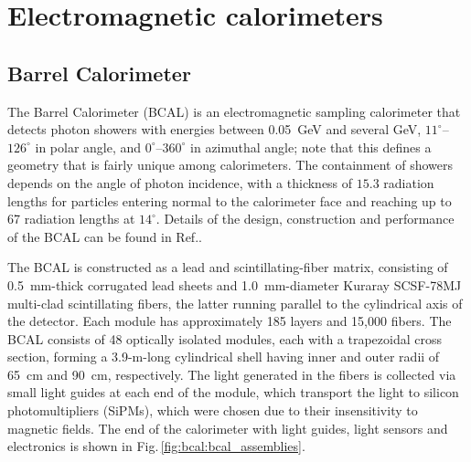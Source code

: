 \section[Electromagnetic calorimeters] {Electromagnetic calorimeters \label{sec:calorimeters}}

\subsection[Barrel Calorimeter ]{Barrel Calorimeter \label{sec:bcal}}
The Barrel Calorimeter (BCAL) is an electromagnetic sampling calorimeter that detects photon showers with energies between 0.05~GeV and several GeV, $11^{\circ}$--$126^{\circ}$ in polar angle, and $0^{\circ}$--$360^{\circ}$ in azimuthal angle; note that this defines a geometry that is fairly unique among calorimeters. The containment of showers depends on the angle of photon incidence, with a thickness of $15.3$ radiation lengths for particles entering normal to the calorimeter face and reaching up to 67 radiation lengths at $14^{\circ}$. Details of the design, construction and performance of the BCAL can be found in Ref.\cite{BEATTIE201824}.

The BCAL is constructed as a lead and  scintillating-fiber matrix, consisting of 0.5~mm-thick corrugated lead sheets and 1.0~mm-diameter Kuraray SCSF-78MJ multi-clad scintillating fibers, the latter running parallel to the cylindrical axis of the detector. Each module has approximately 185 layers and 15,000 fibers. The BCAL consists of 48 optically isolated modules, each with a trapezoidal cross section, forming a  3.9-m-long cylindrical shell having inner and outer radii of 65~cm and 90~cm, respectively. The light generated in the fibers is collected via small light guides at each end of the module, which transport the light to silicon photomultipliers (SiPMs), which were chosen due to their insensitivity to magnetic fields. The end of the calorimeter with light guides, light sensors and electronics is shown in  Fig.\,\ref{fig:bcal:bcal_assemblies}.

